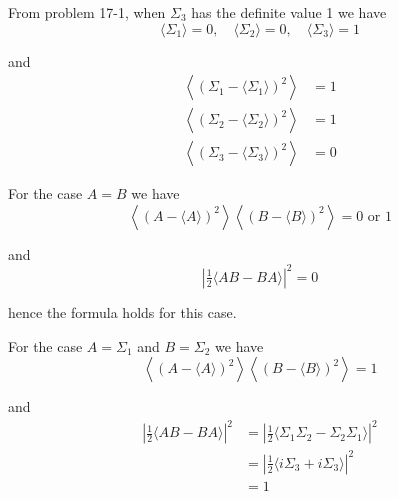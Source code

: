 


\bigskip
From problem 17-1, when $\Sigma_3$ has the definite value 1 we have
\begin{equation*}
\langle\Sigma_1\rangle=0,\quad
\langle\Sigma_2\rangle=0,\quad
\langle\Sigma_3\rangle=1
\end{equation*}

and
\begin{align*}
\left\langle(\Sigma_1-\langle\Sigma_1\rangle)^2\right\rangle&=1
\\
\left\langle(\Sigma_2-\langle\Sigma_2\rangle)^2\right\rangle&=1
\\
\left\langle(\Sigma_3-\langle\Sigma_3\rangle)^2\right\rangle&=0
\end{align*}

For the case $A=B$ we have
\begin{equation*}
\left\langle(A-\langle A\rangle)^2\right\rangle
\left\langle(B-\langle B\rangle)^2\right\rangle
=\text{0 or 1}
\end{equation*}

and
\begin{equation*}
\left|\tfrac{1}{2}\langle AB-BA\rangle\right|^2=0
\end{equation*}

hence the formula holds for this case.

\bigskip
For the case $A=\Sigma_1$ and $B=\Sigma_2$ we have
\begin{equation*}
\left\langle(A-\langle A\rangle)^2\right\rangle
\left\langle(B-\langle B\rangle)^2\right\rangle=1
\end{equation*}

and
\begin{align*}
\left|\tfrac{1}{2}\langle AB-BA\rangle\right|^2
&=\left|\tfrac{1}{2}\langle\Sigma_1\Sigma_2-\Sigma_2\Sigma_1\rangle\right|^2
\\
&=\left|\tfrac{1}{2}\langle i\Sigma_3+i\Sigma_3\rangle\right|^2
\\
&=1
\end{align*}


